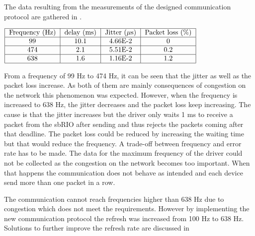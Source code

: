 The data resulting from the measurements of the designed communication protocol are gathered in .

\begin{center}
  $\begin{tabular}{|c|c|c|c|c|}
    \hline
    \text{Frequency (Hz)} & \text{delay (ms)} & \text{Jitter ($\mu$s)} & \text{Packet loss (\%)}\\
    \hline
    99 & 10.1 & 4.66E-2 & 0 \\
    \hline
    474 & 2.1 & 5.51E-2 & 0.2 \\
    \hline
    638 & 1.6 & 1.16E-2 & 1.2 \\
    \hline
  \end{tabular}$
	\label{tab:new_protocol}
\end{center}

From a frequency of 99 Hz to 474 Hz, it can be seen that the jitter as well as the packet loss increase. As both of them are mainly consequences of congestion on the network\cite{cisco_jitter} this phenomenon was expected. However, when the frequency is increased to 638 Hz, the jitter decreases and the packet loss keep increasing. The cause is that the jitter increases but the driver only waits 1 ms to receive a packet from the sbRIO after sending and thus rejects the packets coming after that deadline. The packet loss could be reduced by increasing the waiting time but that would reduce the frequency. A trade-off between frequency and error rate has to be made.
The data for the maximum frequency of the driver could not be collected as the congestion on the network becomes too important. When that happens the communication does not behave as intended and each device send more than one packet in a row.

The communication cannot reach frequencies higher than 638 Hz due to congestion which does not meet the requirements. However by implementing the new communication protocol the refresh was increased from 100 Hz to 638 Hz. Solutions to further improve the refresh rate are discussed in 